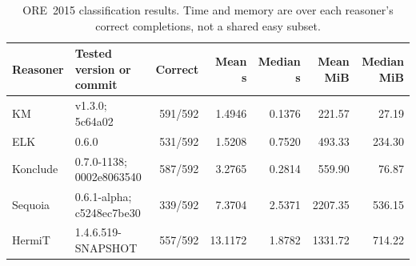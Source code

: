\begin{table}[t]
\centering
\small
\caption{ORE~2015 classification results. Time and memory are over each reasoner's correct completions, not a shared easy subset.}
\label{tab:benchmark}
\begin{tabular}{llrrrrr}
\toprule
Reasoner & Tested version or commit & Correct & Mean s & Median s & Mean MiB & Median MiB \\
\midrule
KM & v1.3.0; 5c64a02 & 591/592 & 1.4946 & 0.1376 & 221.57 & 27.19 \\
ELK & 0.6.0 & 531/592 & 1.5208 & 0.7520 & 493.33 & 234.30 \\
Konclude & 0.7.0-1138; 0002e8063540 & 587/592 & 3.2765 & 0.2814 & 559.90 & 76.87 \\
Sequoia & 0.6.1-alpha; c5248ec7be30 & 339/592 & 7.3704 & 2.5371 & 2207.35 & 536.15 \\
HermiT & 1.4.6.519-SNAPSHOT & 557/592 & 13.1172 & 1.8782 & 1331.72 & 714.22 \\
\bottomrule
\end{tabular}
\end{table}

\begin{table}[t]
\centering
\scriptsize
\caption{Pairwise shared-correct comparison. Each KM/external pair uses the same $n$ ontologies.}
\label{tab:shared}
\end{table}
